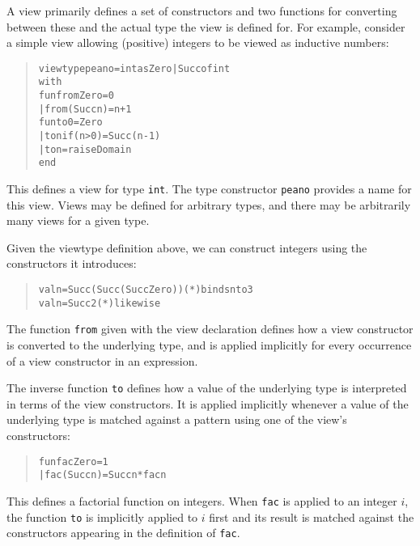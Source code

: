 \documentclass[twoside,titlepage]{article}
\begin{document}
\begin{appendix}
A view primarily defines a set of constructors and two functions for converting between these and the actual type the view is defined for. For example, consider a simple view allowing (positive) integers to be viewed as inductive numbers:

\begin{quote}
\begin{alltt}
viewtype peano = int as Zero | Succ of int
with
   fun from Zero     = 0
     | from (Succ n) = n+1
   fun to 0          = Zero
     | to n if (n>0) = Succ(n-1)
     | to n          = raise Domain
end
\end{alltt}
\end{quote}

This defines a view for type {\tt int}. The type constructor {\tt peano} provides a name for this view. Views may be defined for arbitrary types, and there may be arbitrarily many views for a given type.

Given the viewtype definition above, we can construct integers using the constructors it introduces:

\begin{quote}
\begin{alltt}
val n = Succ(Succ(Succ Zero))   (*) binds n to 3
val n = Succ 2                  (*) likewise
\end{alltt}
\end{quote}

The function {\tt from} given with the view declaration defines how a view constructor is converted to the underlying type, and is applied implicitly for every occurrence of a view constructor in an expression.

The inverse function {\tt to} defines how a value of the underlying type is interpreted in terms of the view constructors. It is applied implicitly whenever a value of the underlying type is matched against a pattern using one of the view's constructors:

\begin{quote}
\begin{alltt}
fun fac Zero    = 1
  | fac(Succ n) = Succ n * fac n
\end{alltt}
\end{quote}

This defines a factorial function on integers. When {\tt fac} is applied to an integer $i$, the function {\tt to} is implicitly applied to $i$ first and its result is matched against the constructors appearing in the definition of {\tt fac}.


\end{appendix}
\end{document}
